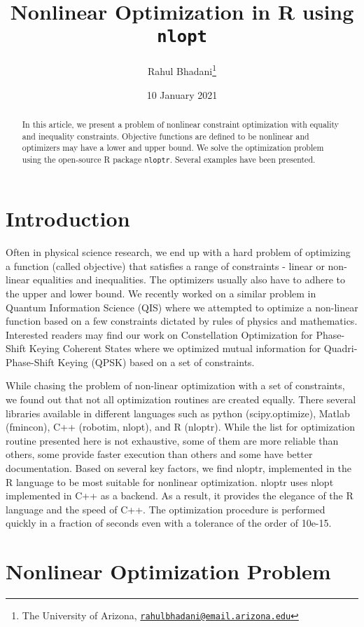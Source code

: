 \documentclass[onecolumn]{article}
\title{Nonlinear Optimization in R using \texttt{nlopt}}
\author{Rahul Bhadani\footnote{The University of Arizona,
  \href{mailto:rahulbhadani@email.arizona.edu}{\nolinkurl{rahulbhadani@email.arizona.edu}}}}
\date{10 January 2021}
\begin{document}
\maketitle
\begin{abstract}
In this article, we present a problem of nonlinear constraint
optimization with equality and inequality constraints. Objective
functions are defined to be nonlinear and optimizers may have a lower
and upper bound. We solve the optimization problem using the open-source
R package \texttt{nloptr}. Several examples have been presented.
\end{abstract}

\section{Introduction}\label{introduction}

Often in physical science research, we end up with a hard problem of
optimizing a function (called objective) that satisfies a range of
constraints - linear or non-linear equalities and inequalities. The
optimizers usually also have to adhere to the upper and lower bound. We
recently worked on a similar problem in Quantum Information Science
(QIS) where we attempted to optimize a non-linear function based on a
few constraints dictated by rules of physics and mathematics. Interested
readers may find our work on Constellation Optimization for Phase-Shift
Keying Coherent States \citep{bhadani2020constellation} where we
optimized mutual information for Quadri-Phase-Shift Keying (QPSK) based
on a set of constraints.

While chasing the problem of non-linear optimization with a set of
constraints, we found out that not all optimization routines are created
equally. There several libraries available in different languages such
as python (scipy.optimize), Matlab (fmincon), C++ (robotim, nlopt), and
R (nloptr). While the list for optimization routine presented here is
not exhaustive, some of them are more reliable than others, some provide
faster execution than others and some have better documentation. Based
on several key factors, we find nloptr, implemented in the R language to
be most suitable for nonlinear optimization. nloptr uses nlopt
implemented in C++ as a backend. As a result, it provides the elegance
of the R language and the speed of C++. The optimization procedure is
performed quickly in a fraction of seconds even with a tolerance of the
order of 10e-15.

\section{Nonlinear Optimization
Problem}\label{nonlinear-optimization-problem}
\end{document}
